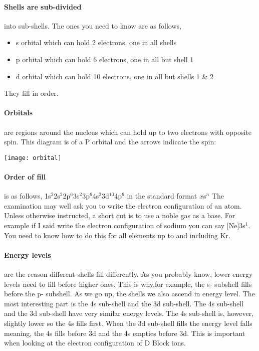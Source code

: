 	\paragraph{Shells are sub-divided} into sub-shells. The ones you need to know are as follows,
	\begin{itemize}
		\item s orbital which can hold 2 electrons, one in all shells
		\item p orbital which can hold 6 electrons, one in all but shell 1
		\item d orbital which can hold 10 electrons, one in all but shells 1 \& 2
	\end{itemize}
	They fill in order.
	
	\paragraph{Orbitals} are regions around the nucleus which can hold up to two electrons with opposite spin.
	This diagram is of a P orbital and the arrows indicate the spin:
    \begin{center}
    \texttt{[image: orbital]}
    \end{center}
    \paragraph{Order of fill} is as follows, 1s$^2$2s$^2$2p$^6$3s$^2$3p$^6$4s$^2$3d$^{10}$4p$^6$ in the standard format $x$s$^n$
    The examination may well ask you to write the electron configuration of an atom.
	Unless otherwise instructed, a short cut is to use a noble gas as a base.
	For example if I said write the electron configuration of sodium you can say [Ne]3s$^1$.
	You need to know how to do this for all elements up to and including Kr.
   \paragraph{Energy levels} are the reason different shells fill differently. 
   As you probably know, lower energy levels need to fill before higher ones.
   This is why,for example, the s- subshell fills before the p- subshell.
   As we go up, the shells we also ascend in energy level.
	The most interesting part is the 4s sub-shell and the 3d sub-shell.
	The 4s sub-shell and the 3d sub-shell have very similar energy levels.
	The 4s sub-shell is, however, slightly lower so the 4s fills first.
	When the 3d sub-shell fills the energy level falls meaning, the 4s fills before 3d and the 4s empties before 3d.
	This is important when looking at the electron configuration of D Block ions.
